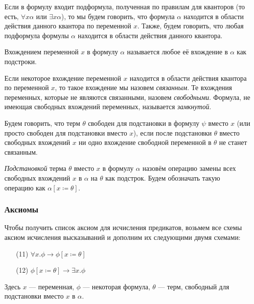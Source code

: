 \begin{definition}Если в формулу входит подформула, полученная по правилам
для кванторов (то есть, $\forall x \alpha$ или $\exists x \alpha$), то 
мы будем говорить, что формула $\alpha$ находится в области действия 
данного квантора по переменной $x$. Также, будем говорить, что любая подформула 
формулы $\alpha$ находится в области действия данного квантора.
\end{definition}

\begin{definition}
Вхождением переменной $x$ в формулу $\alpha$ называется любое её вхождение в $\alpha$ как подстроки.
\end{definition}

\begin{definition}Если некоторое вхождение переменной $x$ находится
в области действия квантора по переменной $x$, то такое вхождение
мы назовем \emph{связанным}. Те вхождения переменных, которые не являются связанными, назовем \emph{свободными}. Формула, не имеющая 
свободных вхождений переменных, называется \emph{замкнутой}.
\end{definition}

\begin{definition}Будем говорить, что терм $\theta$ свободен для
подстановки в формулу $\psi$ вместо $x$ (или просто свободен для 
подстановки вместо $x$), если после подстановки $\theta$ вместо 
свободных вхождений $x$ ни одно вхождение свободной переменной
в $\theta$ не станет связанным.
\end{definition}

\begin{definition}
\emph{Подстановкой} терма $\theta$ вместо $x$ в формулу $\alpha$ назовём операцию замены всех свободных вхождений $x$ в $\alpha$ на $\theta$ как подстрок. Будем обозначать такую операцию как $\alpha[x \coloneqq  \theta]$. 
\end{definition}

\subsubsection*{Аксиомы}
Чтобы получить список аксиом для исчисления предикатов, возьмем все схемы
аксиом исчисления высказываний и дополним их следующими двумя схемами:
\begin{itemize}
    \item[(11)] $\forall x. \phi \rightarrow \phi[x \coloneqq  \theta]$
    \item[(12)] $\phi[x \coloneqq  \theta] \rightarrow \exists x. \phi$
\end{itemize}
Здесь $x$ --- переменная, $\phi$ --- некоторая формула, $\theta$ --- терм, свободный для подстановки вместо $x$ в $\alpha$.

